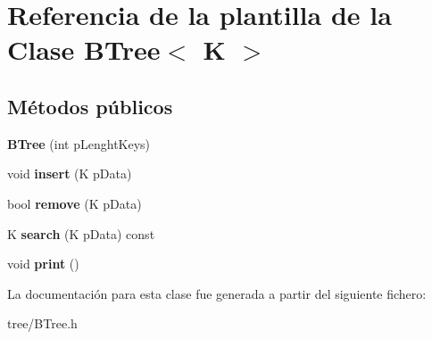 \hypertarget{classBTree}{\section{Referencia de la plantilla de la Clase B\-Tree$<$ K $>$}
\label{classBTree}
}
\subsection*{Métodos públicos}
\begin{DoxyCompactItemize}
\item 
\hypertarget{classBTree_a7b77da63d8a36748b641ec7d7eb1ca7d}{{\bfseries B\-Tree} (int p\-Lenght\-Keys)}\label{classBTree_a7b77da63d8a36748b641ec7d7eb1ca7d}

\item 
\hypertarget{classBTree_aa23d18780a9491c5734bf2cb40330905}{void {\bfseries insert} (K p\-Data)}\label{classBTree_aa23d18780a9491c5734bf2cb40330905}

\item 
\hypertarget{classBTree_a7b0b5e717616c2f2349587eae5fe3e13}{bool {\bfseries remove} (K p\-Data)}\label{classBTree_a7b0b5e717616c2f2349587eae5fe3e13}

\item 
\hypertarget{classBTree_a45bcd8774b4bc322479bbd7d4a7ecbc4}{K {\bfseries search} (K p\-Data) const }\label{classBTree_a45bcd8774b4bc322479bbd7d4a7ecbc4}

\item 
\hypertarget{classBTree_a98a7b173fd34c602682989ac31ca08e2}{void {\bfseries print} ()}\label{classBTree_a98a7b173fd34c602682989ac31ca08e2}

\end{DoxyCompactItemize}


La documentación para esta clase fue generada a partir del siguiente fichero\-:\begin{DoxyCompactItemize}
\item 
tree/B\-Tree.\-h\end{DoxyCompactItemize}
